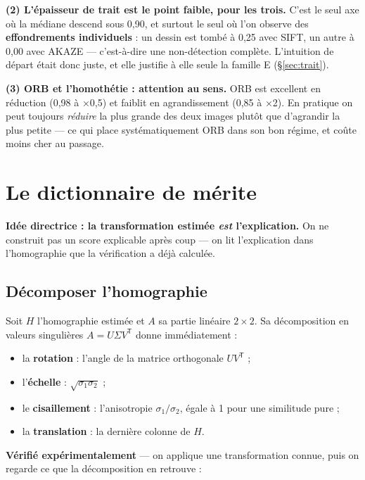 \documentclass[11pt,a4paper]{article}
\newcommand{\aretenir}[1]{%
  \par\medskip
  \noindent\colorbox{encadre}{%
    \begin{minipage}{\dimexpr\linewidth-2\fboxsep}
      \vspace{2pt}#1\vspace{2pt}
    \end{minipage}}%
  \par\medskip
}
\newcommand{\alerte}[1]{\textcolor{alerte}{\textbf{#1}}}
\begin{document}
\textbf{(2) L'épaisseur de trait est le point faible, pour les trois.} C'est le
seul axe où la médiane descend sous 0,90, et surtout le seul où l'on observe des
\alerte{effondrements individuels} : un dessin est tombé à 0,25 avec SIFT, un
autre à 0,00 avec AKAZE — c'est-à-dire une non-détection complète. L'intuition
de départ était donc juste, et elle justifie à elle seule la famille E
(§\ref{sec:trait}).

\textbf{(3) ORB et l'homothétie : attention au sens.} ORB est excellent en
réduction (0,98 à ×0,5) et faiblit en agrandissement (0,85 à ×2). En pratique on
peut toujours \emph{réduire} la plus grande des deux images plutôt que d'agrandir
la plus petite — ce qui place systématiquement ORB dans son bon régime, et coûte
moins cher au passage.

\section{Le dictionnaire de mérite}
\label{sec:dico}

\aretenir{\textbf{Idée directrice : la transformation estimée \emph{est}
l'explication.} On ne construit pas un score explicable après coup — on lit
l'explication dans l'homographie que la vérification a déjà calculée.}

\subsection{Décomposer l'homographie}

Soit $H$ l'homographie estimée et $A$ sa partie linéaire $2\times2$. Sa
décomposition en valeurs singulières $A = U\Sigma V^{\mathsf T}$ donne
immédiatement :

\begin{itemize}[leftmargin=*,itemsep=2pt]
  \item la \textbf{rotation} : l'angle de la matrice orthogonale $UV^{\mathsf T}$ ;
  \item l'\textbf{échelle} : $\sqrt{\sigma_1\sigma_2}$ ;
  \item le \textbf{cisaillement} : l'anisotropie $\sigma_1/\sigma_2$, égale à 1
    pour une similitude pure ;
  \item la \textbf{translation} : la dernière colonne de $H$.
\end{itemize}

\textbf{Vérifié expérimentalement} — on applique une transformation connue, puis
on regarde ce que la décomposition en retrouve :
\end{document}
